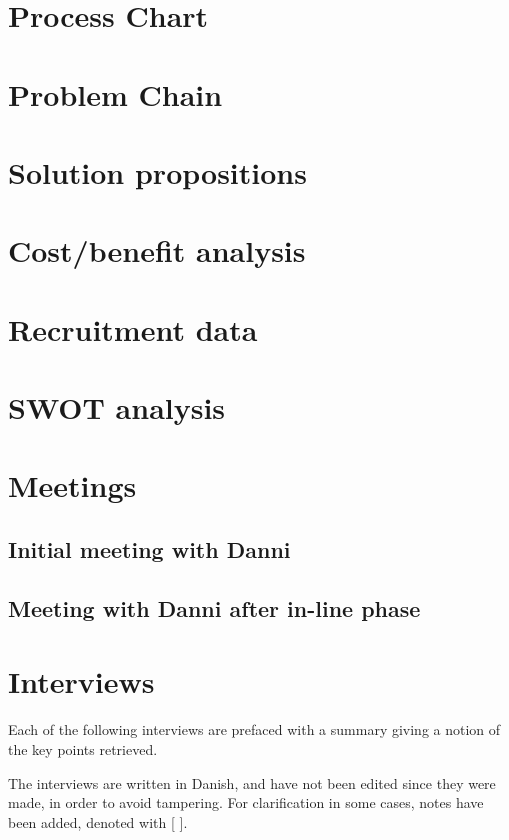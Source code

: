 \chapter{Process Chart}

\chapter{Problem Chain}

\chapter{Solution propositions}

\chapter{Cost/benefit analysis}

\chapter{Recruitment data}

\chapter{SWOT analysis}


\chapter{Meetings}
\section{Initial meeting with Danni}

\section{Meeting with Danni after in-line phase}


\chapter{Interviews}
\label{app:interviews}
Each of the following interviews are prefaced with a summary giving a notion of the key points retrieved.

The interviews are written in Danish, and have not been edited since they were made, in order to avoid tampering.
For clarification in some cases, notes have been added, denoted with [ ].

